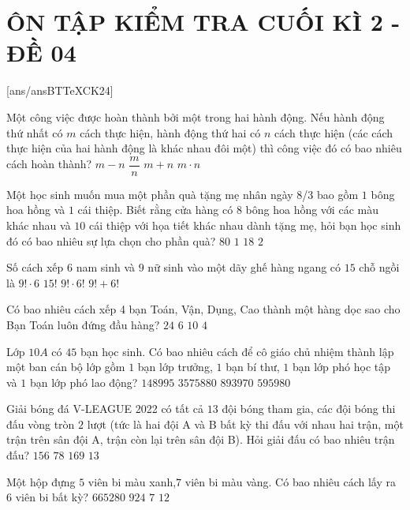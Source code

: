 \section*{ÔN TẬP KIỂM TRA CUỐI KÌ 2 - ĐỀ 04}
\setcounter{ex}{0}\setcounter{bt}{0}
[ans/ansBTTeXCK24]
\begin{ex}
Một công việc được hoàn thành bởi một trong hai hành động. Nếu hành động thứ nhất có $m$ cách thực hiện, hành động thứ hai có $n$ cách thực hiện (các cách thực hiện của hai hành động là khác nhau đôi một) thì công việc đó có bao nhiêu cách hoàn thành?
\choice
{$m-n$}
{$\dfrac{m}{n}$}
{\True $m+n$}
{$m \cdot n$}
\end{ex}
\begin{ex}
Một học sinh muốn mua một phần quà tặng mẹ nhân ngày 8/3 bao gồm $1$ bông hoa hồng và $1$ cái thiệp. Biết rằng cửa hàng có $8$ bông hoa hồng với các màu khác nhau và $10$ cái thiệp với họa tiết khác nhau dành tặng mẹ, hỏi bạn học sinh đó có bao nhiêu sự lựa chọn cho phần quà?
\choice
{\True $80$}
{$1$}
{$18$}
{$2$}
\end{ex}
\begin{ex}
Số cách xếp $6$ nam sinh và $9$ nữ sinh vào một dãy ghế hàng ngang có $15$ chỗ ngồi là
\choice
{$9! \cdot 6$}
{\True $15!$}
{$9! \cdot 6!$}
{$9!+6!$}
\end{ex}
\begin{ex}
Có bao nhiêu cách xếp 4 bạn Toán, Vận, Dụng, Cao thành một hàng dọc sao cho Bạn Toán luôn đứng đầu hàng?
\choice
{$24$}
{\True $6$}
{$10$}
{$4$}
\end{ex}
\begin{ex}
Lớp $10A$ có $45$ bạn học sinh. Có bao nhiêu cách để cô giáo chủ nhiệm thành lập một ban cán bộ lớp gồm $1$ bạn lớp trưởng, $1$ bạn bí thư, $1$ bạn lớp phó học tập và $1$ bạn lớp phó lao động?
\choice
{$148995$}
{\True $3575880$}
{$893970$}
{$595980$}
\end{ex}
\begin{ex}
Giải bóng đá V-LEAGUE 2022 có tất cả $13$ đội bóng tham gia, các đội bóng thi đấu vòng tròn $2$ lượt (tức là hai đội A và B bất kỳ thi đấu với nhau hai trận, một trận trên sân đội A, trận còn lại trên sân đội B). Hỏi giải đấu có bao nhiêu trận đấu?
\choice
{\True $156$}
{$78$}
{$169$}
{$13$}
\end{ex}
\begin{ex}
Một hộp đựng $5$ viên bi màu xanh,$7$ viên bi màu vàng. Có bao nhiêu cách lấy ra $6$ viên bi bất kỳ?
\choice
{$665280$}
{\True $924$}
{$7$}
{$12$}
\end{ex}
